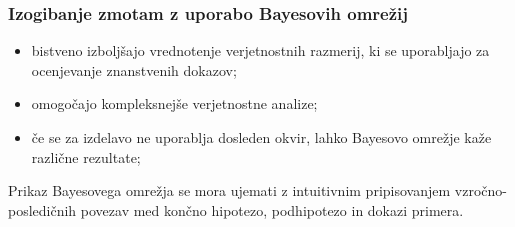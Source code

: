 \documentclass{beamer}
\begin{document}
\begin{frame}
    \frametitle{Izogibanje zmotam z uporabo Bayesovih omrežij}
    \begin{itemize}
        \item bistveno izboljšajo vrednotenje verjetnostnih razmerij, ki se uporabljajo za ocenjevanje znanstvenih dokazov;
        \item omogočajo kompleksnejše verjetnostne analize;
        \item če se za izdelavo ne uporablja dosleden okvir, lahko Bayesovo omrežje kaže različne rezultate;
    \end{itemize} \vspace{3mm}
    \begin{block}{}
        Prikaz Bayesovega omrežja se mora ujemati z intuitivnim pripisovanjem vzročno-posledičnih povezav med končno hipotezo, podhipotezo in dokazi primera.
    \end{block}
\end{frame}

\end{document}
